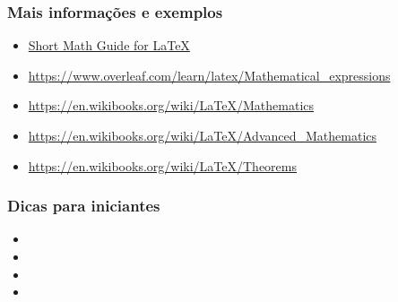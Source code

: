 \begin{frame}
\frametitle{Mais informações e exemplos}

\begin{itemize}
\item \href{http://tug.ctan.org/info/short-math-guide/short-math-guide.pdf}{Short Math Guide for \LaTeX}
\item \url{https://www.overleaf.com/learn/latex/Mathematical_expressions}
\item \url{https://en.wikibooks.org/wiki/LaTeX/Mathematics}
\item \url{https://en.wikibooks.org/wiki/LaTeX/Advanced_Mathematics}
\item \url{https://en.wikibooks.org/wiki/LaTeX/Theorems}
\end{itemize}

\end{frame}


\begin{frame}
\frametitle{Dicas para iniciantes}

\begin{itemize}
\item {}
\item {}
\item {}
\item {}
\end{itemize}
\end{frame}
